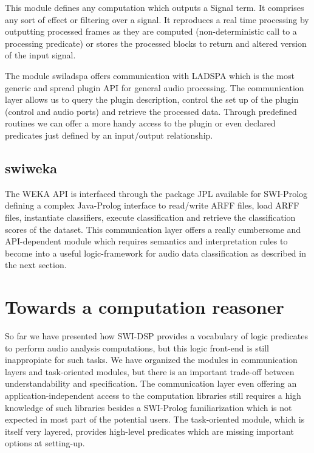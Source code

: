 \documentclass[runningheads]{llncs}
\begin{document}
This module defines any computation which outputs a Signal term. It comprises any sort of effect or filtering over a signal. It reproduces a real time processing by outputting processed frames as they are computed (non-deterministic call to a processing predicate) or stores the processed blocks to return and altered version of the input signal. 

The module swiladspa offers communication with LADSPA which is the most generic and spread plugin API for general audio processing. The communication layer allows us to query the plugin description, control the set up of the plugin (control and audio ports) and retrieve the processed data. Through predefined routines we can offer a more handy access to the plugin or even declared predicates just defined by an input/output relationship.

\subsection{swiweka}\label{subsec:swiweka}

The WEKA API is interfaced through the package JPL available for SWI-Prolog defining a complex Java-Prolog interface to read/write ARFF files, load ARFF files, instantiate classifiers, execute classification and retrieve the classification scores of the dataset. This communication layer offers a really cumbersome and API-dependent module which requires semantics and interpretation rules to become into a useful logic-framework for audio data classification as described in the next section.

\section{Towards a computation reasoner}\label{sec:reasoner}

So far we have presented how SWI-DSP provides a vocabulary of logic predicates to perform audio analysis computations, but this logic front-end is still inappropiate for such tasks. We have organized the modules in communication layers and task-oriented modules, but there is an important trade-off between understandability and specification. The communication layer even offering an application-independent access to the computation libraries still requires a high knowledge of such libraries besides a SWI-Prolog familiarization which is not expected in most part of the potential users. The task-oriented module, which is itself very layered, provides high-level predicates which are missing important options at setting-up.
\end{document}
